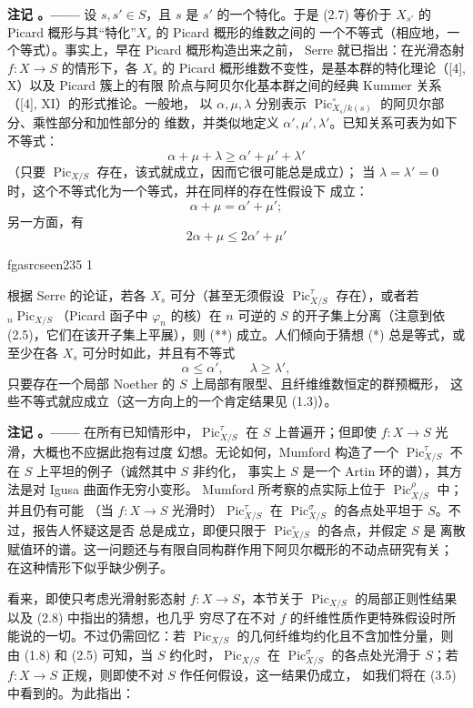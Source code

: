 \documentclass[12pt,twoside,openany]{book}
\numberwithin{equation}{section}
\newcommand{\fgaunitid}{unbound}
\newcommand{\src}[1]{%
  \phantomsection
  \hypertarget{src:\fgaunitid:#1}{}%
  \hypertarget{fga.\fgaunitid.p#1}{}%
  \ifcsname fgasrcseen#1\endcsname\else
    \expandafter\gdef\csname fgasrcseen#1\endcsname{1}%
    \hypertarget{src:#1}{}%
  \fi
  \marginpar{\raggedleft\footnotesize\sffamily #1}%
}
\theoremstyle{plain}
\theoremstyle{definition}
\theoremstyle{remark}
\newcommand{\result}[2]{%
  \par\medskip\noindent\textbf{#1%
  \if\relax\detokenize{#2}\relax\else\space#2\fi。——}\enspace
}
\begin{document}
\result{注记}{2.8} 设 $s,s'\in S$，且 $s$ 是 $s'$ 的一个特化。于是 (2.7)
等价于 $X_{s'}$ 的 Picard 概形与其“特化”$X_s$ 的 Picard 概形的维数之间的
一个不等式（相应地，一个等式）。事实上，早在 Picard 概形构造出来之前，
Serre 就已指出：在光滑态射 $f:X\longrightarrow S$ 的情形下，各 $X_s$ 的
Picard 概形维数不变性，是基本群的特化理论（[4], X）以及 Picard 簇上的有限
阶点与阿贝尔化基本群之间的经典 Kummer 关系（[4], XI）的形式推论。一般地，
以 $\alpha,\mu,\lambda$ 分别表示
$\operatorname{Pic}_{X_s/k(s)}^\circ$ 的阿贝尔部分、乘性部分和加性部分的
维数，并类似地定义 $\alpha',\mu',\lambda'$。已知关系可表为如下不等式：
\[
\tag{*}\alpha+\mu+\lambda\geq\alpha'+\mu'+\lambda'
\]
（只要 $\operatorname{Pic}_{X/S}$ 存在，该式就成立，因而它很可能总是成立）；
当 $\lambda=\lambda'=0$ 时，这个不等式化为一个等式，并在同样的存在性假设下
成立：
\[
\alpha+\mu=\alpha'+\mu' ;
\]
另一方面，有
\[
\tag{**}2\alpha+\mu\leq2\alpha'+\mu'
\]

\src{235}
根据 Serre 的论证，若各 $X_s$ 可分（甚至无须假设
$\operatorname{Pic}_{X/S}^\tau$ 存在），或者若
${}_n\operatorname{Pic}_{X/S}$（Picard 函子中 $\varphi_n$ 的核）在 $n$ 可逆的 $S$ 的开子集上分离（注意到依 (2.5)，它们在该开子集上平展），则 (**) 成立。人们倾向于猜想
(*) 总是等式，或至少在各 $X_s$ 可分时如此，并且有不等式
\[
\tag{***}\alpha\leq\alpha',\qquad\lambda\geq\lambda',
\]
只要存在一个局部 Noether 的 $S$ 上局部有限型、且纤维维数恒定的群预概形，
这些不等式就应成立（这一方向上的一个肯定结果见 (1.3)）。

\result{注记}{2.9} 在所有已知情形中，$\operatorname{Pic}_{X/S}^\tau$ 在
$S$ 上普遍开；但即使 $f:X\longrightarrow S$ 光滑，大概也不应据此抱有过度
幻想。无论如何，Mumford 构造了一个
$\operatorname{Pic}_{X/S}^\tau$ 不在 $S$ 上平坦的例子（诚然其中 $S$ 非约化，
事实上 $S$ 是一个 Artin 环的谱），其方法是对 Igusa 曲面作无穷小变形。
Mumford 所考察的点实际上位于 $\operatorname{Pic}_{X/S}^\rho$ 中；并且仍有可能
（当 $f:X\longrightarrow S$ 光滑时）$\operatorname{Pic}_{X/S}^\tau$ 在
$\operatorname{Pic}_{X/S}^\sigma$ 的各点处平坦于 $S$。不过，报告人怀疑这是否
总是成立，即便只限于 $\operatorname{Pic}_{X/S}^\circ$ 的各点，并假定 $S$ 是
离散赋值环的谱。这一问题还与有限自同构群作用下阿贝尔概形的不动点研究有关；
在这种情形下似乎缺少例子。

看来，即使只考虑光滑射影态射 $f:X\longrightarrow S$，本节关于
$\operatorname{Pic}_{X/S}$ 的局部正则性结果以及 (2.8) 中指出的猜想，也几乎
穷尽了在不对 $f$ 的纤维性质作更特殊假设时所能说的一切。不过仍需回忆：若
$\operatorname{Pic}_{X/S}$ 的几何纤维均约化且不含加性分量，则由 (1.8) 和
(2.5) 可知，当 $S$ 约化时，$\operatorname{Pic}_{X/S}$ 在
$\operatorname{Pic}_{X/S}^\sigma$ 的各点处光滑于 $S$；若
$f:X\longrightarrow S$ 正规，则即使不对 $S$ 作任何假设，这一结果仍成立，
如我们将在 (3.5) 中看到的。为此指出：
\end{document}
